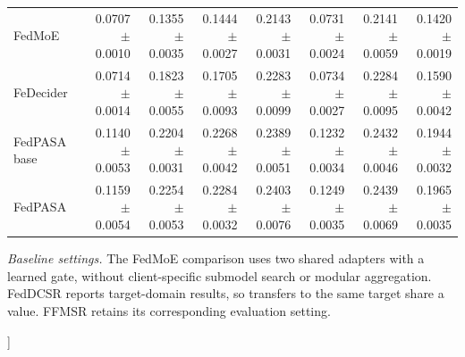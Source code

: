 {\begin{minipage}{\textwidth}
\begin{tabular*}{\linewidth}{@{\extracolsep{\fill}}lrrrrrrr@{}}
FedMoE~\citep{mei2024fedmoe} & 0.0707$\pm$0.0010 & 0.1355$\pm$0.0035 & 0.1444$\pm$0.0027 & 0.2143$\pm$0.0031 & 0.0731$\pm$0.0024 & 0.2141$\pm$0.0059 & 0.1420$\pm$0.0019 \\
FeDecider~\citep{he2026fedecider} & 0.0714$\pm$0.0014 & 0.1823$\pm$0.0055 & 0.1705$\pm$0.0093 & 0.2283$\pm$0.0099 & 0.0734$\pm$0.0027 & 0.2284$\pm$0.0095 & 0.1590$\pm$0.0042 \\
FedPASA base & 0.1140$\pm$0.0053 & 0.2204$\pm$0.0031 & 0.2268$\pm$0.0042 & 0.2389$\pm$0.0051 & 0.1232$\pm$0.0034 & 0.2432$\pm$0.0046 & 0.1944$\pm$0.0032 \\
FedPASA & 0.1159$\pm$0.0054 & 0.2254$\pm$0.0053 & 0.2284$\pm$0.0032 & 0.2403$\pm$0.0076 & 0.1249$\pm$0.0035 & 0.2439$\pm$0.0069 & 0.1965$\pm$0.0035 \\
\bottomrule
\end{tabular*}
\end{minipage}\par\addvspace{6pt}


\par\noindent\begin{minipage}{\textwidth}\small\textit{Baseline settings.} The FedMoE comparison uses two shared adapters with a learned gate, without client-specific submodel search or modular aggregation. FedDCSR reports target-domain results, so transfers to the same target share a value. FFMSR retains its corresponding evaluation setting.\end{minipage}\par
}]
